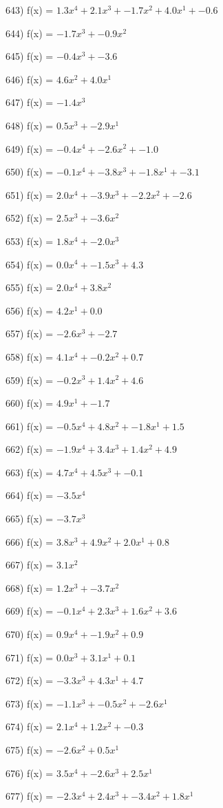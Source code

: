 \documentclass[10pt,a4paper]{article}
\begin{document}
643) f(x) = $1.3x^4 + 2.1x^3 + -1.7x^2 + 4.0x^1 + -0.6$

644) f(x) = $-1.7x^3 + -0.9x^2$

645) f(x) = $-0.4x^3 + -3.6$

646) f(x) = $4.6x^2 + 4.0x^1$

647) f(x) = $-1.4x^3$

648) f(x) = $0.5x^3 + -2.9x^1$

649) f(x) = $-0.4x^4 + -2.6x^2 + -1.0$

650) f(x) = $-0.1x^4 + -3.8x^3 + -1.8x^1 + -3.1$

651) f(x) = $2.0x^4 + -3.9x^3 + -2.2x^2 + -2.6$

652) f(x) = $2.5x^3 + -3.6x^2$

653) f(x) = $1.8x^4 + -2.0x^3$

654) f(x) = $0.0x^4 + -1.5x^3 + 4.3$

655) f(x) = $2.0x^4 + 3.8x^2$

656) f(x) = $4.2x^1 + 0.0$

657) f(x) = $-2.6x^3 + -2.7$

658) f(x) = $4.1x^4 + -0.2x^2 + 0.7$

659) f(x) = $-0.2x^3 + 1.4x^2 + 4.6$

660) f(x) = $4.9x^1 + -1.7$

661) f(x) = $-0.5x^4 + 4.8x^2 + -1.8x^1 + 1.5$

662) f(x) = $-1.9x^4 + 3.4x^3 + 1.4x^2 + 4.9$

663) f(x) = $4.7x^4 + 4.5x^3 + -0.1$

664) f(x) = $-3.5x^4$

665) f(x) = $-3.7x^3$

666) f(x) = $3.8x^3 + 4.9x^2 + 2.0x^1 + 0.8$

667) f(x) = $3.1x^2$

668) f(x) = $1.2x^3 + -3.7x^2$

669) f(x) = $-0.1x^4 + 2.3x^3 + 1.6x^2 + 3.6$

670) f(x) = $0.9x^4 + -1.9x^2 + 0.9$

671) f(x) = $0.0x^3 + 3.1x^1 + 0.1$

672) f(x) = $-3.3x^3 + 4.3x^1 + 4.7$

673) f(x) = $-1.1x^3 + -0.5x^2 + -2.6x^1$

674) f(x) = $2.1x^4 + 1.2x^2 + -0.3$

675) f(x) = $-2.6x^2 + 0.5x^1$

676) f(x) = $3.5x^4 + -2.6x^3 + 2.5x^1$

677) f(x) = $-2.3x^4 + 2.4x^3 + -3.4x^2 + 1.8x^1$
\end{document}
